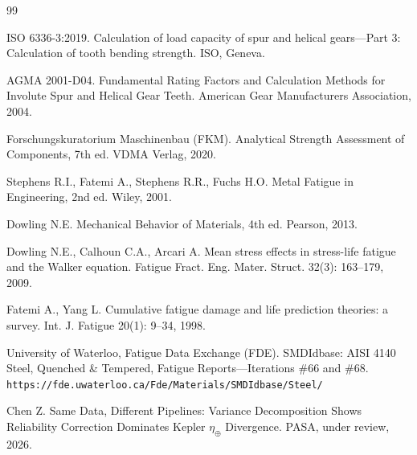 \documentclass[12pt,a4paper]{article}
\begin{document}
\begin{thebibliography}{99}

ISO 6336-3:2019. Calculation of load capacity of spur and helical
gears---Part 3: Calculation of tooth bending strength. ISO, Geneva.

AGMA 2001-D04. Fundamental Rating Factors and Calculation Methods for
Involute Spur and Helical Gear Teeth. American Gear Manufacturers
Association, 2004.

Forschungskuratorium Maschinenbau (FKM). Analytical Strength Assessment
of Components, 7th ed. VDMA Verlag, 2020.

Stephens R.I., Fatemi A., Stephens R.R., Fuchs H.O. Metal Fatigue in
Engineering, 2nd ed. Wiley, 2001.

Dowling N.E. Mechanical Behavior of Materials, 4th ed. Pearson, 2013.

Dowling N.E., Calhoun C.A., Arcari A. Mean stress effects in
stress-life fatigue and the Walker equation. Fatigue Fract. Eng. Mater.
Struct. 32(3): 163--179, 2009.

Fatemi A., Yang L. Cumulative fatigue damage and life prediction
theories: a survey. Int. J. Fatigue 20(1): 9--34, 1998.

University of Waterloo, Fatigue Data Exchange (FDE). SMDIdbase: AISI
4140 Steel, Quenched \& Tempered, Fatigue Reports---Iterations \#66 and
\#68. \texttt{https://fde.uwaterloo.ca/Fde/Materials/SMDIdbase/Steel/}

Chen Z. Same Data, Different Pipelines: Variance Decomposition Shows
Reliability Correction Dominates Kepler $\eta_\oplus$ Divergence.
PASA, under review, 2026.

\end{thebibliography}
\end{document}
